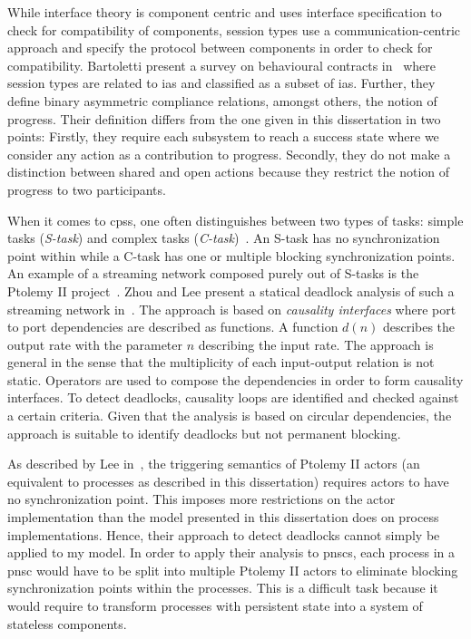 While interface theory is component centric and uses interface specification to check for compatibility of components, session types use a communication-centric approach and specify the protocol between components in order to check for compatibility.
Bartoletti \etal present a survey on behavioural contracts in~\cite{bartoletti2015} where session types are related to \glspl{ia} and classified as a subset of \Glspl{ia}.
Further, they define binary asymmetric compliance relations, amongst others, the notion of progress.
Their definition differs from the one given in this dissertation in two points:
Firstly, they require each subsystem to reach a success state where we consider any action as a contribution to progress.
Secondly, they do not make a distinction between shared and open actions because they restrict the notion of progress to two participants.

When it comes to \glspl{cps}, one often distinguishes between two types of tasks: simple tasks (\emph{S-task}) and complex tasks (\emph{C-task})~\cite{kopetz2011a}.
An S-task has no synchronization point within while a C-task has one or multiple blocking synchronization points.
An example of a streaming network composed purely out of S-tasks is the Ptolemy II project~\cite{lee2003}.
Zhou and Lee present a statical deadlock analysis of such a streaming network in~\cite{zhou2006}.
The approach is based on \emph{causality interfaces} where port to port dependencies are described as functions.
A function $d(n)$ describes the output rate with the parameter $n$ describing the input rate.
The approach is general in the sense that the multiplicity of each input-output relation is not static.
Operators are used to compose the dependencies in order to form causality interfaces.
To detect deadlocks, causality loops are identified and checked against a certain criteria.
Given that the analysis is based on circular dependencies, the approach is suitable to identify deadlocks but not permanent blocking.

As described by Lee \etal in~\cite{lee2003}, the triggering semantics of Ptolemy II actors (an equivalent to processes as described in this dissertation) requires actors to have no synchronization point.
This imposes more restrictions on the actor implementation than the model presented in this dissertation does on process implementations.
Hence, their approach to detect deadlocks cannot simply be applied to my model.
In order to apply their analysis to \glspl{pnsc}, each process in a \gls{pnsc} would have to be split into multiple Ptolemy II actors to eliminate blocking synchronization points within the processes.
This is a difficult task because it would require to transform processes with persistent state into a system of stateless components.

